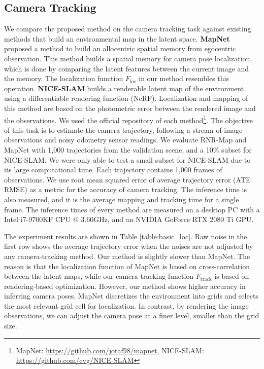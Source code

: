 \documentclass[10pt,twocolumn,letterpaper]{article}
\begin{document}
\subsection{Camera Tracking}\label{appendix:exp_loc:track}
We compare the proposed method on the camera tracking task against existing methods that build an environmental map in the latent space.
%
\textbf{MapNet}\cite{MapNet} proposed a method to build an allocentric spatial memory from egocentric observation. 
%
This method builds a spatial memory for camera pose localization, which is done by comparing the latent features between the current image and the memory.
%
The localization function $F_\mathrm{loc}$ in our method resembles this operation.
%
\textbf{NICE-SLAM}\cite{nice-slam} builds a renderable latent map of the environment using a differentiable rendering function (NeRF).
%
Localization and mapping of this method are based on the photometric error between the rendered image and the observations.
%
%
We used the official repository of each method\footnote{MapNet: \url{https://github.com/jotaf98/mapnet}, NICE-SLAM: \url{https://github.com/cvg/NICE-SLAM}}. 
%
The objective of this task is to estimate the camera trajectory, following a stream of image observations and noisy odometry sensor readings.
%
We evaluate RNR-Map and MapNet with 1,000 trajectories from the validation scene, and a 10\% subset for NICE-SLAM.
%
We were only able to test a small subset for NICE-SLAM due to its large computational time.
Each trajectory contains 1,000 frames of observations.
%
We use root mean squared error of average trajectory error (ATE RMSE) \cite{ate} as a metric for the accuracy of camera tracking.
%
The inference time is also measured, and it is the average mapping and tracking time for a single frame. 
%
The inference times of every method are measured on a desktop PC with a Intel i7-9700KF CPU @ 3.60GHz, and an NVIDIA GeForce RTX 2080 Ti GPU.

The experiment results are shown in Table \ref{table:basic_loc}.
%
Raw noise in the first row shows the average trajectory error when the noises are not adjusted by any camera-tracking method.
%
Our method is slightly slower than MapNet.
%
The reason is that the localization function of MapNet is based on cross-correlation between the latent maps, while our camera tracking function $F_\mathrm{track}$ is based on rendering-based optimization.
%
However, our method shows higher accuracy in inferring camera poses. 
%
MapNet discretizes the environment into grids and selects the most relevant grid cell for localization.
%
In contrast, by rendering the image observations, we can adjust the camera pose at a finer level, smaller than the grid size.
\end{document}

